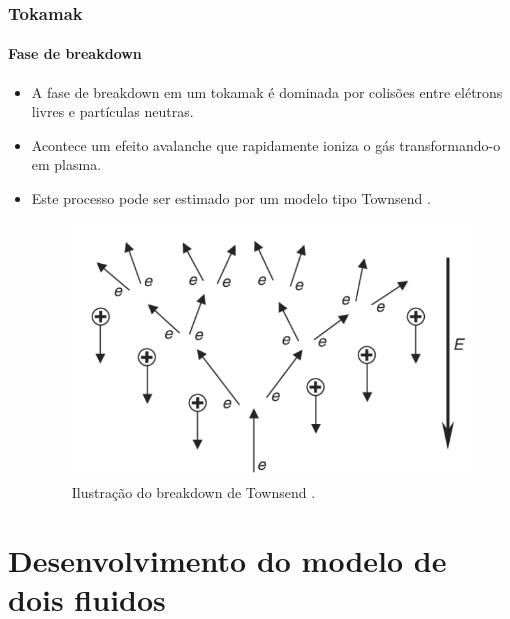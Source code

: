 \documentclass[aspectratio=169]{beamer}
\begin{document}
	
	\begin{frame}
		\frametitle{Tokamak}
		\framesubtitle{Fase de breakdown}
\begin{itemize}
\item  A fase de breakdown em um tokamak é dominada por colisões entre elétrons livres e partículas neutras.
\item Acontece um efeito avalanche que rapidamente ioniza o gás transformando-o em plasma.
\item Este processo pode ser estimado por um modelo tipo Townsend \cite{yoo2014ohmic}. %

	\begin{figure}[H]
				\centering
			\includegraphics[width=.4\linewidth]{avalanche.png} 
				\caption{Ilustração do breakdown de Townsend \cite{article0}.}
		
			\end{figure}
\end{itemize}

	\end{frame}
	

\section{Desenvolvimento do modelo de dois fluidos}
\end{document}
